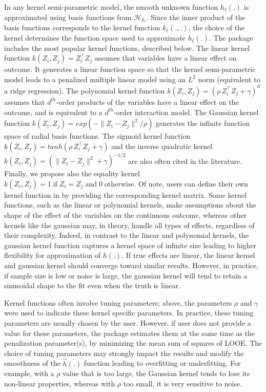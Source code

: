 In any kernel semi-parametric model, the smooth unknown function $h_{\ell}(.)$ is approximated using basis functions from $\mathcal{H}_{k_{\ell}}$. Since the inner product of the basis functions corresponds to the kernel function $k_{\ell}(.,.)$, the choice of the kernel determines the function space used to approximate $h_{\ell}(.)$. The  package includes the most popular kernel functions, described below. The linear kernel function $ k(Z_i, Z_j) = Z_i^\top Z_j$ assumes that variables have a linear effect on outcome. It generates a linear function space so that the kernel semi-parametric model leads to a penalized multiple linear model using an $L^2$ norm (equivalent to a ridge regression). The polynomial kernel function $ k(Z_i, Z_j) = (\rho \, Z_i^\top Z_j + \gamma)^d$ assumes that $d^{th}$-order products of the variables have a linear effect on the outcome, and is equivalent to a $d^{th}$-order interaction model. The Gaussian kernel function $k(Z_i, Z_j) = exp(-\parallel Z_i - Z_j\parallel^2 / \rho)$ generates the infinite function space of radial basis functions. The sigmoid kernel function $k(Z_i, Z_j) = tanh(\rho \, Z_i^\top Z_j + \gamma)$ and the inverse quadratic kernel $k(Z_i, Z_j) = (\parallel Z_i - Z_j\parallel^2 + \gamma)^{-1/2}$ are also often cited in the literature. Finally, we propose also the equality kernel $k(Z_i, Z_j) = 1 \; \text{if} \; Z_i = Z_j \; \text{and}  \; 0 \; \text{otherwise}$. Of note, users can define their own kernel function in  by providing the corresponding kernel matrix. Some kernel functions, such as the linear or polynomial kernels, make assumptions about the shape of the effect of the variables on the continuous outcome, whereas other kernels like the gaussian may, in theory, handle all types of effects, regardless of their complexity. Indeed, in contrast to the linear and polynomial kernels, the gaussian kernel function captures a kernel space of infinite size leading to higher flexibility for approximation of $h(.)$. If true effects are linear, the linear kernel and gaussian kernel should converge toward similar results. However, in practice, if sample size is low or noise is large, the gaussian kernel will tend to retain a sinusoidal shape to the fit even when the truth is linear.

Kernel functions often involve tuning parameters; above, the parameters $\rho$ and $\gamma$ were used to indicate these kernel specific parameters. In practice, these tuning parameters are usually chosen by the user. However, if user does not provide a value for these parameters, the  package estimates them at the same time as the penalization parameter(s), by minimizing the mean sum of squares of LOOE. The choice of tuning parameters may strongly impact the results and modify the smoothness of the $\hat{h}(.)$ function leading to overfitting or underfitting. For example, with a $\rho$ value that is too large, the Gaussian kernel tends to lose its non-linear properties, whereas with $\rho$ too small, it is very sensitive to noise. 

